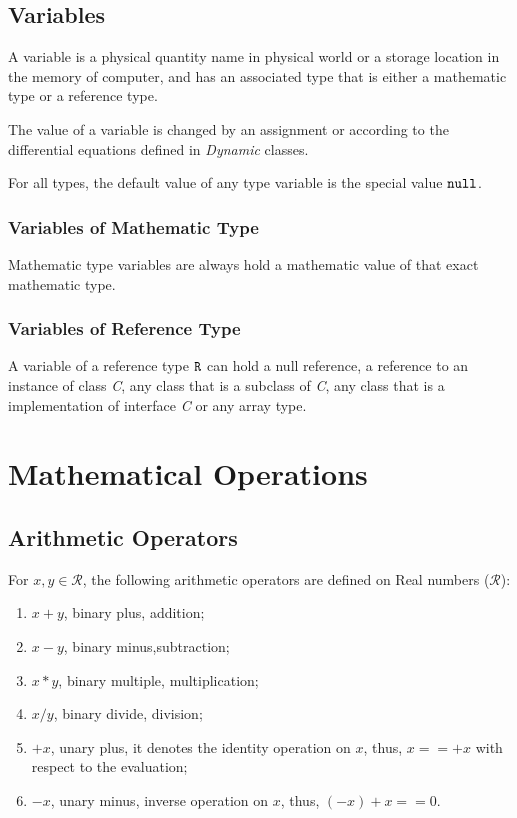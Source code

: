 \documentclass{WileySix}
\begin{document}
\subsection{Variables}

A variable is a physical quantity name in physical world or a storage location in the memory of computer, and has an associated type that is either a mathematic type or a reference type.

The value of a variable  is changed by an assignment or according to the differential equations defined in {\em Dynamic} classes.

For all types, the default value of any type variable is the special value ${\tt null}$.

\subsubsection{Variables of Mathematic Type}
Mathematic type variables are always hold a mathematic value of that exact mathematic type.


\subsubsection{Variables of Reference Type}
A variable of a reference type ${\tt R}$ can hold a null reference, a reference to an instance of class {\em C}, any class that is a subclass of {\em C}, any class that is a implementation of interface {\em C} or any array type.



\section{Mathematical Operations}

\subsection{Arithmetic Operators}
For $x,y \in \mathcal{R}$, the following arithmetic operators are defined on Real numbers ($\mathcal{R}$):

\begin{enumerate}
\item  $x + y$,  binary plus, addition;
\item  $x - y$,  binary minus,subtraction;
\item  $x * y$,  binary multiple, multiplication;
\item  $x / y$,  binary divide, division;
\item  $+x$, unary plus, it denotes the identity operation on $x$, thus, $x == +x$ with
 respect to the evaluation;
\item  $-x$,  unary minus, inverse operation on $x$, thus, $(-x) + x == 0$.
\end{enumerate}
\end{document}
